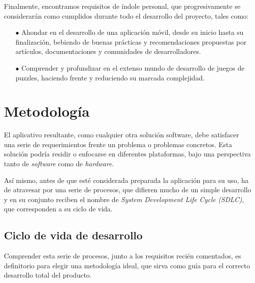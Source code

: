 Finalmente, encontramos requisitos de índole personal, que progresivamente se considerarán como cumplidos durante todo el desarrollo del proyecto,
tales como:

\begin{itemize}
   \item[$\bullet$] Ahondar en el desarrollo de una aplicación móvil, desde su inicio hasta su finalización,
   bebiendo de buenas prácticas y recomendaciones propuestas por artículos, documentaciones y comunidades de desarrolladores.
   \item[$\bullet$] Comprender y profundizar en el extenso mundo de desarrollo de juegos de puzzles, haciendo frente y reduciendo su
   marcada complejidad.
\end{itemize}

\section{Metodología}

El aplicativo resultante, como cualquier otra solución software, debe satisfacer una serie de requerimientos frente un problema
o problemas concretos. %
Esta solución podría residir o enfocarse en diferentes plataformas, bajo una perspectiva
tanto de \textit{software} como de \textit{hardware}.

Así mismo, antes de que esté considerada preparada la aplicación para su uso, ha de atravesar por una serie de procesos,
que difieren mucho de un simple desarrollo y en su conjunto reciben el nombre de \textit{System Development Life Cycle (SDLC)},
que corresponden a su ciclo de vida.

\subsection{Ciclo de vida de desarrollo}
Comprender esta serie de procesos, junto a los requisitos recién comentados, es definitorio para elegir una metodología ideal,
que sirva como guía para el correcto desarrollo total del producto.

